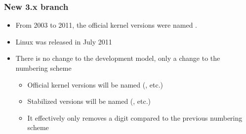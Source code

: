\begin{frame}
\begin{columns}
  \end{columns}
\end{frame}

\begin{frame}
  \frametitle{New 3.x branch}
  \begin{itemize}
  \item From 2003 to 2011, the official kernel versions were named .
  \item Linux  was released in July 2011
  \item There is no change to the development model, only a change to
    the numbering scheme
    \begin{itemize}
    \item Official kernel versions will be named 
      (, etc.)
    \item Stabilized versions will be named 
      (, etc.)
    \item It effectively only removes a digit compared to the previous
      numbering scheme
    \end{itemize}
  \end{itemize}
\end{frame}

